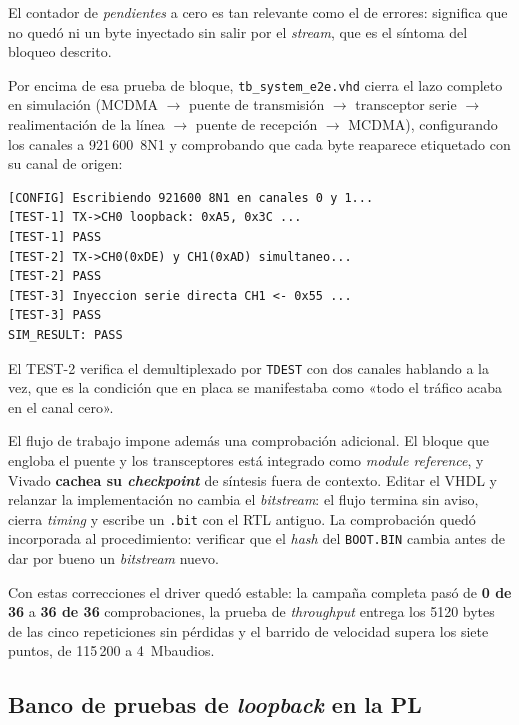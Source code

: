 El contador de \textit{pendientes} a cero es tan relevante como el de errores: significa que no
quedó ni un byte inyectado sin salir por el \textit{stream}, que es el síntoma del bloqueo
descrito.

Por encima de esa prueba de bloque, \texttt{tb\_system\_e2e.vhd} cierra el lazo completo en
simulación (MCDMA $\rightarrow$ puente de transmisión $\rightarrow$ transceptor serie
$\rightarrow$ realimentación de la línea $\rightarrow$ puente de recepción $\rightarrow$ MCDMA),
configurando los canales a 921\,600~8N1 y comprobando que cada byte reaparece etiquetado con su
canal de origen:

\begin{lstlisting}[style=terminal, caption={Salida de la simulación del sistema completo, \texttt{tb\_system\_e2e.vhd}}]
[CONFIG] Escribiendo 921600 8N1 en canales 0 y 1...
[TEST-1] TX->CH0 loopback: 0xA5, 0x3C ...
[TEST-1] PASS
[TEST-2] TX->CH0(0xDE) y CH1(0xAD) simultaneo...
[TEST-2] PASS
[TEST-3] Inyeccion serie directa CH1 <- 0x55 ...
[TEST-3] PASS
SIM_RESULT: PASS
\end{lstlisting}

El TEST-2 verifica el demultiplexado por \texttt{TDEST} con dos canales hablando a la vez, que es
la condición que en placa se manifestaba como «todo el tráfico acaba en el canal cero».

El flujo de trabajo impone además una comprobación adicional. El bloque que engloba el puente y
los transceptores está integrado como \textit{module reference}, y Vivado \textbf{cachea su
\textit{checkpoint}} de síntesis fuera de contexto. Editar el VHDL y relanzar la implementación
no cambia el \textit{bitstream}: el flujo termina sin aviso, cierra \textit{timing} y escribe un
\texttt{.bit} con el RTL antiguo. La comprobación quedó incorporada al procedimiento: verificar
que el \textit{hash} del \texttt{BOOT.BIN} cambia antes de dar por bueno un \textit{bitstream}
nuevo.

Con estas correcciones el driver quedó estable: la campaña completa pasó de \textbf{0 de 36} a
\textbf{36 de 36} comprobaciones, la prueba de \textit{throughput} entrega los 5120 bytes de las
cinco repeticiones sin pérdidas y el barrido de velocidad supera los siete puntos, de 115\,200 a
4~Mbaudios.

\subsection{Banco de pruebas de \textit{loopback} en la PL} \label{sec:bench_loopback}

